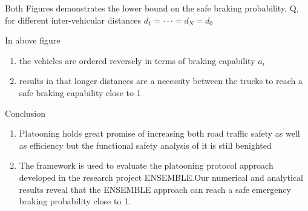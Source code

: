 \documentclass{beamer}
\begin{document}
\begin{frame}{}
Both Figures demonstrates the lower bound on the
safe braking probability, Q, for different inter-vehicular distances $d_{1} = \cdot
\cdot\cdot = d_{N} = d_{0}$
\begin{block}{}
In above figure
\begin{enumerate}
    \item the vehicles are ordered reversely in terms of
braking capability $a_{i}$\\
\item results in that longer distances are a necessity between the trucks to reach
a safe braking capability close to 1
\end{enumerate}
\end{block}   
\end{frame}
\begin{frame}
\begin{block}{Conclusion}
\begin{enumerate}
    \item Platooning holds great promise of increasing both road
traffic safety as well as efficiency but the functional safety
analysis of it is still benighted \\
    \item  The framework is used to evaluate the platooning protocol approach developed in the research project ENSEMBLE.Our numerical and analytical results reveal that the ENSEMBLE approach can reach a safe emergency
braking probability close to 1.
\end{enumerate}
  \end{block}
\end{frame}
\end{document}
